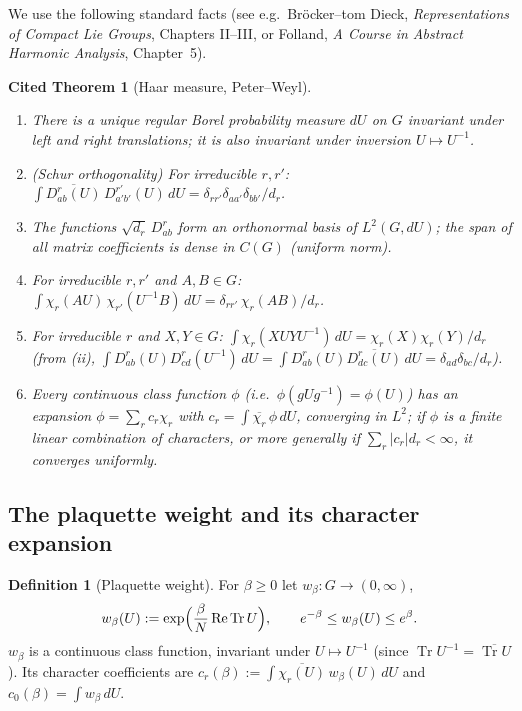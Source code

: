 \documentclass[11pt,a4paper]{article}
\newtheorem{citedtheorem}[theorem]{Cited Theorem}
\theoremstyle{definition}
\newtheorem{definition}[theorem]{Definition}
\theoremstyle{remark}
\DeclareMathOperator{\Tr}{Tr}
\newcommand{\dU}{\,dU}
\begin{document}
We use the following standard facts (see e.g.\ Bröcker--tom Dieck, \emph{Representations of Compact Lie
Groups}, Chapters II--III, or Folland, \emph{A Course in Abstract Harmonic Analysis}, Chapter~5).

\begin{citedtheorem}[Haar measure, Peter--Weyl]\label{thm:pw}
\begin{enumerate}[label=(\roman*)]
\item There is a unique regular Borel probability measure $dU$ on $G$ invariant under left and right
translations; it is also invariant under inversion $U\mapsto U^{-1}$.
\item (Schur orthogonality) For irreducible $r,r'$:
$\int \overline{D^r_{ab}(U)}\,D^{r'}_{a'b'}(U)\dU=\delta_{rr'}\delta_{aa'}\delta_{bb'}/d_r$.
\item The functions $\sqrt{d_r}\,D^r_{ab}$ form an orthonormal basis of $L^2(G,dU)$; the span of all matrix
coefficients is dense in $C(G)$ (uniform norm).
\item For irreducible $r,r'$ and $A,B\in G$:
$\int\chi_r(AU)\,\chi_{r'}(U^{-1}B)\dU=\delta_{rr'}\,\chi_r(AB)/d_r$.
\item For irreducible $r$ and $X,Y\in G$: $\int\chi_r(XUYU^{-1})\dU=\chi_r(X)\chi_r(Y)/d_r$
(from (ii), $\int D^r_{ab}(U)D^r_{cd}(U^{-1})\dU=\int D^r_{ab}(U)\overline{D^r_{dc}(U)}\dU=\delta_{ad}\delta_{bc}/d_r$).
\item Every continuous class function $\phi$ (i.e.\ $\phi(gUg^{-1})=\phi(U)$) has an expansion
$\phi=\sum_r c_r\chi_r$ with $c_r=\int\overline{\chi_r}\,\phi\dU$, converging in $L^2$; if $\phi$ is a
finite linear combination of characters, or more generally if $\sum_r|c_r|d_r<\infty$, it converges uniformly.
\end{enumerate}
\end{citedtheorem}

\subsection{The plaquette weight and its character expansion}

\begin{definition}[Plaquette weight]
For $\beta\ge0$ let $w_\beta:G\to(0,\infty)$,
\begin{equation}\label{eq:w}
w_\beta(U):=\exp\Bigl(\frac{\beta}{N}\,\mathrm{Re}\Tr U\Bigr),\qquad
e^{-\beta}\le w_\beta(U)\le e^{\beta}.
\end{equation}
$w_\beta$ is a continuous class function, invariant under $U\mapsto U^{-1}$ (since $\Tr U^{-1}=\overline{\Tr U}$).
Its character coefficients are $c_r(\beta):=\int\overline{\chi_r(U)}\,w_\beta(U)\dU$ and
$c_0(\beta)=\int w_\beta\dU$.
\end{definition}
\end{document}
